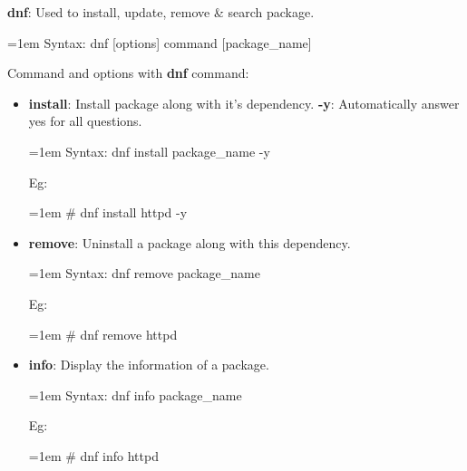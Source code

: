 \setlength{\columnsep}{3pt}
\begin{flushleft}
	\bigskip
	
	\textbf{dnf}: Used to install, update, remove \& search package.
	\begin{tcolorbox}[breakable,notitle,boxrule=-0pt,colback=pink,colframe=pink]
		\color{black}
		\font=1em
		Syntax: dnf [options] command [package\_name]
		\font=4pt
	\end{tcolorbox}
	Command and options with \textbf{dnf} command:
	
	\begin{itemize}
		\item \textbf{install}: Install package along with it's dependency.
		\newline
		\textbf{-y}: Automatically answer yes for all questions.
		\begin{tcolorbox}[breakable,notitle,boxrule=-0pt,colback=pink,colframe=pink]
			\color{black}
			\font=1em
			Syntax: dnf install package\_name -y
			\font=4pt
		\end{tcolorbox}
		Eg:
		\begin{tcolorbox}[breakable,notitle,boxrule=-0pt,colback=black,colframe=black]
			\color{green}
			\font=1em
			\# dnf install httpd -y
			\font=4pt
		\end{tcolorbox}
		\bigskip
		\bigskip
		\item \textbf{remove}: Uninstall a package along with this dependency.
		\begin{tcolorbox}[breakable,notitle,boxrule=-0pt,colback=pink,colframe=pink]
			\color{black}
			\font=1em
			Syntax: dnf remove package\_name 
			\font=4pt
		\end{tcolorbox}
		Eg:
		\begin{tcolorbox}[breakable,notitle,boxrule=-0pt,colback=black,colframe=black]
			\color{green}
			\font=1em
			\# dnf remove httpd
			\font=4pt
		\end{tcolorbox}
		\bigskip
		\bigskip		
		
		\item \textbf{info}: Display the information of a package.
		\begin{tcolorbox}[breakable,notitle,boxrule=-0pt,colback=pink,colframe=pink]
			\color{black}
			\font=1em
			Syntax: dnf info package\_name 
			\font=4pt
		\end{tcolorbox}
		Eg:
		\begin{tcolorbox}[breakable,notitle,boxrule=-0pt,colback=black,colframe=black]
			\color{green}
			\font=1em
			\# dnf info httpd
			\font=4pt
		\end{tcolorbox}
		\bigskip
		\bigskip		


\end{itemize}
\end{flushleft}
